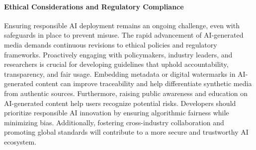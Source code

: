 \paragraph{Ethical Considerations and Regulatory Compliance}
Ensuring responsible AI deployment remains an ongoing challenge, even with safeguards in place to prevent misuse. The rapid advancement of AI-generated media demands continuous revisions to ethical policies and regulatory frameworks. Proactively engaging with policymakers, industry leaders, and researchers is crucial for developing guidelines that uphold accountability, transparency, and fair usage. Embedding metadata or digital watermarks in AI-generated content can improve traceability and help differentiate synthetic media from authentic sources. Furthermore, raising public awareness and education on AI-generated content help users recognize potential risks. Developers should prioritize responsible AI innovation by ensuring algorithmic fairness while minimizing bias. Additionally, fostering cross-industry collaboration and promoting global standards will contribute to a more secure and trustworthy AI ecosystem.
